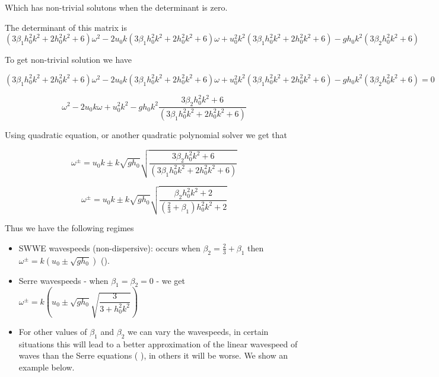 \documentclass[10pt]{article}
\begin{document}
Which has non-trivial solutons when the determinant is zero. 

The determinant of this matrix is
\begin{equation}
\left(3\beta_1 h_0^2 k^2 + 2h_0^2 k^2 + 6\right)\omega^2 - 2 u_0k \left(3\beta_1 h_0^2 k^2 + 2h_0^2 k^2 + 6\right)\omega  + u_0^2 k^2 \left(3\beta_1 h_0^2 k^2 + 2h_0^2 k^2 + 6\right) - g h_0 k^2 \left(3 \beta_2 h_0^2 k^2 + 6\right)
\end{equation} 

To get non-trivial solution we have

\begin{equation}
\left(3\beta_1 h_0^2 k^2 + 2h_0^2 k^2 + 6\right)\omega^2 - 2 u_0k \left(3\beta_1 h_0^2 k^2 + 2h_0^2 k^2 + 6\right)\omega  + u_0^2 k^2 \left(3\beta_1 h_0^2 k^2 + 2h_0^2 k^2 + 6\right) - g h_0 k^2 \left(3 \beta_2 h_0^2 k^2 + 6\right) = 0
\end{equation} 

\begin{equation}
\omega^2 - 2 u_0k \omega  + u_0^2 k^2 - g h_0 k^2 \dfrac{3 \beta_2 h_0^2 k^2 + 6}{\left(3\beta_1 h_0^2 k^2 + 2h_0^2 k^2 + 6\right)} 
\end{equation} 

Using quadratic equation, or another quadratic polynomial solver we get that

\begin{equation}
\omega^\pm = u_0 k \pm k \sqrt{gh_0} \sqrt{\dfrac{3 \beta_2 h_0^2 k^2 + 6}{\left(3\beta_1 h_0^2 k^2 + 2h_0^2 k^2 + 6\right)} }
\end{equation}

\begin{equation}
\omega^\pm = u_0 k \pm k \sqrt{gh_0} \sqrt{\dfrac{\beta_2 h_0^2 k^2 + 2}{\left(\frac{2}{3} + \beta_1\right) h_0^2 k^2 + 2} }
\end{equation}


Thus we have the following regimes
\begin{itemize}
	\item SWWE wavespeeds (non-dispersive): occurs when $\beta_2 = \frac{2}{3} + \beta_1$ then $\omega^\pm = k\left(u_0\pm \sqrt{gh_0}\right)$ (\cite{Clamond-Dutykh-2018-237}).
	\item Serre wavespeeds - when $\beta_1 = \beta_2 = 0$ - we get $\omega^\pm = k\left(u_0\pm \sqrt{gh_0} \sqrt{\dfrac{3}{3 + h_0^2 k^2}}\right)$
	\item For other values of $\beta_1$ and $\beta_2$ we can vary the wavespeeds, in certain situations this will lead to a better approximation of the linear wavespeed of waves than the Serre equations ( \cite{Clamond-Dutykh-2018-237}), in others it will be worse. We show an example below.
\end{itemize}
\end{document}
